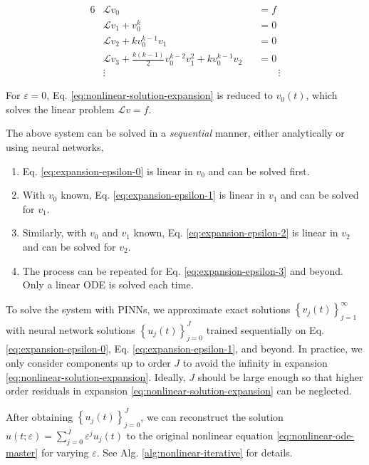 \documentclass[accepted]{uai2023}
\renewcommand{\L}{\mathcal{L}}
\begin{document}
    {
        \small
        \begin{alignat}{6}
            &\L v_0 &&= f \label{eq:expansion-epsilon-0}\\
            &\L v_1 + v_0^k &&= 0 \label{eq:expansion-epsilon-1}\\
            &\L v_2 + k v_0^{k-1}v_1 &&= 0 \label{eq:expansion-epsilon-2} \\
            &\L v_3 + \frac{k(k-1)}{2} v_0^{k-2}v_1^2 + k v_0^{k-1}v_2 &&= 0 \label{eq:expansion-epsilon-3} \\[-1em]
            &\vdots &&\phantom{=}\,\,\,\,\vdots\nonumber
        \end{alignat}
    }

    For $\varepsilon = 0$, Eq. \ref{eq:nonlinear-solution-expansion} is reduced to $v_0(t)$, which solves the linear problem $\L v=f$. 

    \begingroup
        \setlength{\itemsep}{0pt}
        \setlength{\parskip}{0pt}
        The above system can be solved in a \textit{sequential} manner, either analytically or using neural networks,
        \begin{enumerate}
            \item Eq. \ref{eq:expansion-epsilon-0} is linear in $v_0$ and can be solved first. 
            \item With $v_0$ known, Eq. \ref{eq:expansion-epsilon-1} is linear in $v_1$ and can be solved for $v_1$. 
            \item Similarly, with $v_0$ and $v_1$ known, Eq. \ref{eq:expansion-epsilon-2} is linear in $v_2$ and can be solved for $v_2$.
            \item The process can be repeated for Eq. \ref{eq:expansion-epsilon-3} and beyond. Only a linear ODE is solved each time.
        \end{enumerate}
        To solve the system with PINNs, we approximate exact solutions $\left\{v_j(t)\right\}_{j=1}^{\infty}$ with neural network solutions $\left\{u_j(t)\right\}_{j=0}^{J}$ trained sequentially on Eq. \ref{eq:expansion-epsilon-0}, Eq. \ref{eq:expansion-epsilon-1}, and beyond. 
        In practice, we only consider components up to order $J$ to avoid the infinity in expansion \ref{eq:nonlinear-solution-expansion}. 
        Ideally, $J$ should be large enough so that higher order residuals in expansion \ref{eq:nonlinear-solution-expansion} can be neglected.
    \endgroup

    After obtaining $\left\{u_j(t)\right\}_{j=0}^{J}$, we can reconstruct the solution $u(t;\varepsilon) = \sum_{j=0}^{J} \varepsilon^j u_j(t)$ to the original nonlinear equation \ref{eq:nonlinear-ode-master} for varying $\varepsilon$.
    See Alg. \ref{alg:nonlinear-iterative} for details.
\end{document}
